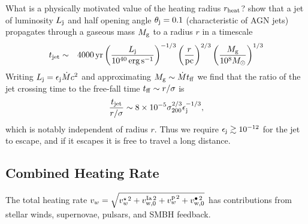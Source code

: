 \documentclass[usenatbib,fleqn]{mn2e}
\newcommand{\vwO}{v_{w}}
\begin{document}
What is a physically motivated value of the heating radius $r_{\rm
  heat}$?  \citet{Bromberg+11} show that a jet of luminosity $L_{\rm
  j}$ and half opening angle $\theta_{\rm j} = 0.1$ (characteristic of
AGN jets) propagates through a gaseous mass $M_{\rm g}$ to a radius
$r$ in a timescale
\begin{eqnarray}
t_{\rm jet} &\sim& 4000\,{\rm yr}\left(\frac{{L}_{\rm j}}{10^{40}\,\rm erg\,s^{-1}}\right)^{-1/3}\left(\frac{r}{\rm pc}\right)^{2/3}\left(\frac{M_{\rm g}}{10^{8}M_{\odot}}\right)^{1/3} 
\end{eqnarray}
Writing $L_{\rm j} = \epsilon_{\rm j}\dot{M}c^{2}$ and approximating $M_{\rm g} \sim \dot{M}t_{\rm ff}$ we find that the ratio of the jet crossing time to the free-fall time $t_{\rm ff} \sim r/\sigma$ is 
\begin{equation}
\frac{t_{\rm jet}}{r/\sigma} \sim 8\times 10^{-5}\sigma_{200}^{2/3}\epsilon_{\rm j}^{-1/3},
\end{equation}
which is notably independent of radius $r$.  Thus we require $\epsilon_{\rm j} \gtrsim 10^{-12}$ for the jet to escape, and if it escapes it is free to travel a long distance. 

\subsection{Combined Heating Rate} 

The total heating rate $\vwO = \sqrt{v_{w}^{\star \, 2} + v_{\rm
    w,0}^{\rm Ia \, 2} + v_{w}^{\rm p \, 2} + v_{\rm
    w,0}^{\bullet \, 2}}$ has
contributions from stellar winds, supernovae, pulsars, and SMBH
feedback. %
\end{document}
